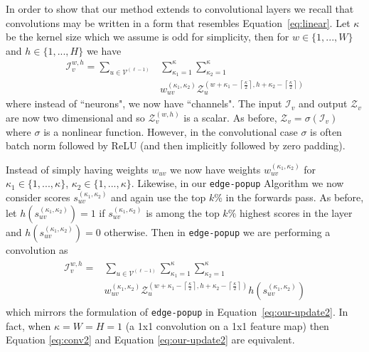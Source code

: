 \documentclass[10pt,twocolumn,letterpaper]{article}
\newcommand*{\V}{\mathcal{V}}
\newcommand*{\I}{\mathcal{I}}
\newcommand*{\Z}{\mathcal{Z}}
\newcommand{\alg}{\texttt{edge-popup} }
\begin{document}
In order to show that our method extends to convolutional layers we recall that convolutions may be written in a form that resembles Equation~\ref{eq:linear}. Let $\kappa$ be the kernel size which we assume is odd for simplicity, then for $w \in \{1,...,W\}$ and $h \in \{1,...,H\}$ we have
\begin{equation} \label{eq:conv}
\begin{split}
    \I_{v}^{w,h} = \sum_{u \in \V^{(\ell - 1)}}& \sum_{\kappa_1=1}^{\kappa} \sum_{\kappa_2 = 1}^{\kappa} \\
    &w_{uv}^{(\kappa_1,\kappa_2)} \Z_u^{\left(w+\kappa_1 -
    \left\lceil\frac{\kappa}{2}\right\rceil, h+\kappa_2 - \left\lceil\frac{\kappa}{2}\right\rceil\right)}
\end{split}
\end{equation}
where instead of ``neurons", we now have ``channels". The input $\I_v$ and output $\Z_v$ are now two dimensional and so $\Z_v^{(w,h)}$ is a scalar. As before, $\Z_v = \sigma\left(\I_v\right)$ where $\sigma$ is a nonlinear function. However, in the convolutional case $\sigma$ is often batch norm \cite{batchnorm} followed by ReLU (and then implicitly followed by zero padding).






Instead of simply having weights $w_{uv}$ we now have weights $w_{uv}^{(\kappa_1,\kappa_2)}$ for $\kappa_1 \in \{1,...,\kappa\}$, $\kappa_2 \in \{1,...,\kappa\}$. Likewise, in our \alg Algorithm we now consider scores $s_{uv}^{(\kappa_1,\kappa_2)}$ and again use the top $k$\% in the forwards pass. As before, let $h\left(s_{uv}^{(\kappa_1,\kappa_2)}\right) = 1$ if $s_{uv}^{(\kappa_1,\kappa_2)}$ is among the top $k\%$ highest scores in the layer and $h\left(s_{uv}^{(\kappa_1,\kappa_2)}\right) = 0$ otherwise. Then in \alg we are performing a convolution as
\begin{align} \label{eq:conv2}
\begin{split}
    \I_{v}^{w,h} = &\sum_{u \in \V^{(\ell - 1)}} \sum_{\kappa_1=1}^{\kappa} \sum_{\kappa_2 = 1}^{\kappa} \\
    &w_{uv}^{(\kappa_1,\kappa_2)} \Z_u^{\left(w+\kappa_1 -
    \left\lceil\frac{\kappa}{2}\right\rceil, h+\kappa_2 - \left\lceil\frac{\kappa}{2}\right\rceil\right)} h\left(s_{uv}^{(\kappa_1, \kappa_2)}\right)
\end{split}
\end{align}
which mirrors the formulation of \alg in Equation~\ref{eq:our-update2}.  In fact, when $\kappa = W = H = 1$ (\ie a 1x1 convolution on a 1x1 feature map) then Equation \ref{eq:conv2} and Equation \ref{eq:our-update2} are equivalent. 
\end{document}
